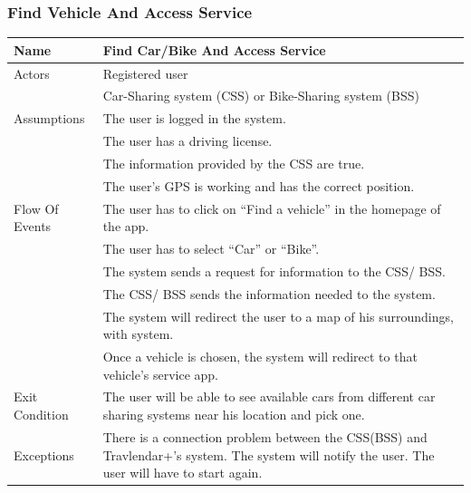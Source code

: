 \documentclass{article}
\begin{document}
\subsubsection{Find Vehicle And Access Service}
\begin{center}
\begin{tabular}{| p{3cm} || p{8cm} |}
\hline
Name & Find Car/Bike And Access Service \\ \hline
Actors & Registered user\\&
Car-Sharing system (CSS) or Bike-Sharing system (BSS)
\\ \hline
Assumptions &The user is logged in the system.\\&
The user has a driving license.\\&
The information provided by the CSS are true.\\&
The user’s GPS is working and has the correct position.
 \\ \hline
Flow Of Events & The user has to click on “Find a vehicle” in the homepage of the app.\\&
The user has to select “Car” or “Bike”.\\&
The system sends a request for information to the CSS/ BSS.\\&
The CSS/ BSS sends the information needed to the system.\\&
The system will redirect the user to a map of his surroundings, with system.\\&
Once a vehicle is chosen, the system will redirect to that vehicle’s service app.
\\ \hline
Exit Condition & The user will be able to see available cars from different car sharing systems near his location and pick one. \\ \hline
Exceptions & There is a connection problem between the CSS(BSS) and Travlendar+’s system. The system will notify the user. The user will have to start again. \\
\hline
\end{tabular}
\end{center}
\end{document}

